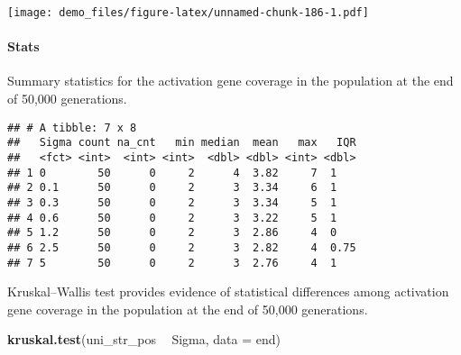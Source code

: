 \documentclass[]{book}
\newenvironment{Shaded}{\begin{snugshade}}{\end{snugshade}}
\newcommand{\DataTypeTok}[1]{\textcolor[rgb]{0.13,0.29,0.53}{#1}}
\newcommand{\KeywordTok}[1]{\textcolor[rgb]{0.13,0.29,0.53}{\textbf{#1}}}
\newcommand{\NormalTok}[1]{#1}
\newcommand{\OperatorTok}[1]{\textcolor[rgb]{0.81,0.36,0.00}{\textbf{#1}}}
\newcommand{\OtherTok}[1]{\textcolor[rgb]{0.56,0.35,0.01}{#1}}
\newcommand{\StringTok}[1]{\textcolor[rgb]{0.31,0.60,0.02}{#1}}
\let\oldparagraph\paragraph
\renewcommand{\paragraph}[1]{\oldparagraph{#1}\mbox{}}
\begin{document}
\texttt{[image: demo\_files/figure-latex/unnamed-chunk-186-1.pdf]}

\hypertarget{stats-36}{%
\paragraph{Stats}\label{stats-36}}

Summary statistics for the activation gene coverage in the population at the end of 50,000 generations.

\begin{Shaded}
\end{Shaded}

\begin{verbatim}
## # A tibble: 7 x 8
##   Sigma count na_cnt   min median  mean   max   IQR
##   <fct> <int>  <int> <int>  <dbl> <dbl> <int> <dbl>
## 1 0        50      0     2      4  3.82     7  1   
## 2 0.1      50      0     2      3  3.34     6  1   
## 3 0.3      50      0     2      3  3.34     5  1   
## 4 0.6      50      0     2      3  3.22     5  1   
## 5 1.2      50      0     2      3  2.86     4  0   
## 6 2.5      50      0     2      3  2.82     4  0.75
## 7 5        50      0     2      3  2.76     4  1
\end{verbatim}

Kruskal--Wallis test provides evidence of statistical differences among activation gene coverage in the population at the end of 50,000 generations.

\begin{Shaded}
\begin{Highlighting}[]
\KeywordTok{kruskal.test}\NormalTok{(uni_str_pos }\OperatorTok{~}\StringTok{ }\NormalTok{Sigma, }\DataTypeTok{data =}\NormalTok{ end)}
\end{Highlighting}
\end{Shaded}
\end{document}
